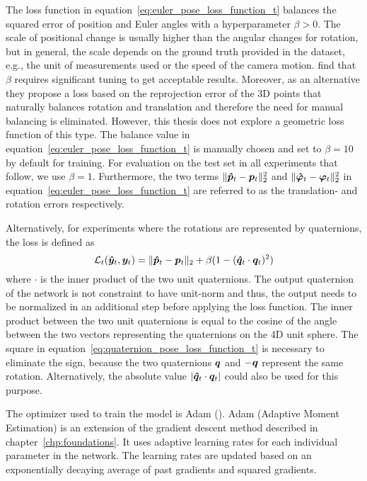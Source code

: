 		
		The loss function in equation~\ref{eq:euler_pose_loss_function_t} balances the squared error of position and Euler angles with a hyperparameter $\beta > 0$.
		The scale of positional change is usually higher than the angular changes for rotation, but in general, the scale depends on the ground truth provided in the dataset, e.g., the unit of measurements used or the speed of the camera motion.
		\cite{kendall2017geometric} find that $\beta$ requires significant tuning to get acceptable results.
		Moreover, as an alternative they propose a loss based on the reprojection error of the 3D points that naturally balances rotation and translation and therefore the need for manual balancing is eliminated.
		However, this thesis does not explore a geometric loss function of this type.
		The balance value in equation~\ref{eq:euler_pose_loss_function_t} is manually chosen and set to $\beta = 10$ by default for training.
		For evaluation on the test set in all experiments that follow, we use $\beta = 1$.
		Furthermore, the two terms 
		$\lVert \bm{\hat{p}}_t - \bm{p}_t\rVert_2^2$ and 
		$\lVert \bm{\hat{\varphi}}_t - \bm{\varphi}_t \rVert_2^2$
		in equation~\ref{eq:euler_pose_loss_function_t} are referred to as the translation- and rotation errors respectively.
		
		Alternatively, for experiments where the rotations are represented by quaternions, the loss is defined as
		\begin{equation}\label{eq:quaternion_pose_loss_function_t}
			\mathcal{L}_t(\bm{\hat{y}}_t, \bm{y}_t) = 
			\lVert \bm{\hat{p}}_t - \bm{p}_t \rVert_2 + 
			\beta (1 - (\bm{\hat{q}}_t \cdot \bm{q}_t)^2)
		\end{equation}
		where $\cdot$ is the inner product of the two unit quaternions.
		The output quaternion of the network is not constraint to have unit-norm and thus, the output needs to be normalized in an additional step before applying the loss function.
		The inner product between the two unit quaternions is equal to the cosine of the angle between the two vectors representing the quaternions on the 4D unit sphere.
		The square in equation~\ref{eq:quaternion_pose_loss_function_t} is necessary to eliminate the sign, because the two quaternions $\bm{q}$ and $-\bm{q}$ represent the same rotation.
		Alternatively, the absolute value $\lvert \bm{\hat{q}}_t \cdot \bm{q}_t \rvert$ could also be used for this purpose.
		
		The optimizer used to train the model is Adam (\cite{kingma2014adam}).
		Adam (Adaptive Moment Estimation) is an extension of the gradient descent method described in chapter~\ref{chp:foundations}.
		It uses adaptive learning rates for each individual parameter in the network.
		The learning rates are updated based on an exponentially decaying average of past gradients and squared gradients.
		
